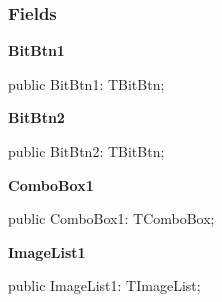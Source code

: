 \documentclass{report}
\newif\ifpdf
\begin{document}
\subsubsection*{\large{\textbf{Fields}}\normalsize\hspace{1ex}\hfill}
\begin{list}{}{
\setlength{\itemindent}{0cm}
\setlength{\listparindent}{0cm}
\setlength{\leftmargin}{\evensidemargin}
\addtolength{\leftmargin}{\tmplength}
\settowidth{\labelsep}{X}
\addtolength{\leftmargin}{\labelsep}
\setlength{\labelwidth}{\tmplength}
}
\label{swcatalog.TSCForm-BitBtn1}
\item[\textbf{BitBtn1}\hfill]
\ifpdf
\begin{flushleft}
\fi
\begin{ttfamily}
public BitBtn1: TBitBtn;\end{ttfamily}

\ifpdf
\end{flushleft}
\fi


\par  \label{swcatalog.TSCForm-BitBtn2}
\item[\textbf{BitBtn2}\hfill]
\ifpdf
\begin{flushleft}
\fi
\begin{ttfamily}
public BitBtn2: TBitBtn;\end{ttfamily}

\ifpdf
\end{flushleft}
\fi


\par  \label{swcatalog.TSCForm-ComboBox1}
\item[\textbf{ComboBox1}\hfill]
\ifpdf
\begin{flushleft}
\fi
\begin{ttfamily}
public ComboBox1: TComboBox;\end{ttfamily}

\ifpdf
\end{flushleft}
\fi


\par  \label{swcatalog.TSCForm-ImageList1}
\item[\textbf{ImageList1}\hfill]
\ifpdf
\begin{flushleft}
\fi
\begin{ttfamily}
public ImageList1: TImageList;\end{ttfamily}

\ifpdf
\end{flushleft}
\fi



\end{list}
\end{document}
